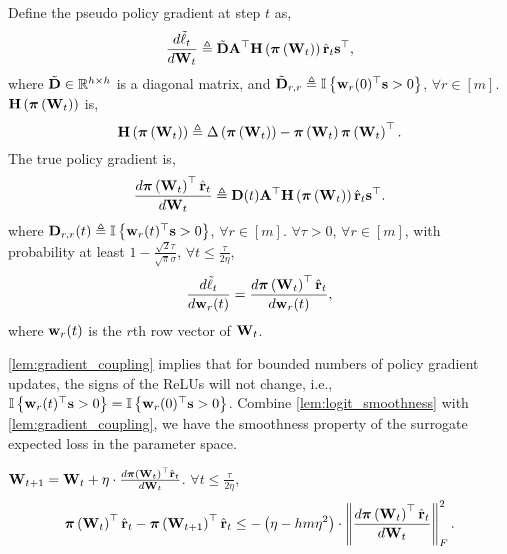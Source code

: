 \begin{lem}
\label{lem:gradient_coupling}
	Define the pseudo policy gradient at step $t$ as,
\begin{equation*}
\begin{split}
	\frac{d \tilde{\ell}_t}{d {\mathbf{W}}_t} \triangleq \tilde{{\mathbf{D}}} {\mathbf{A}}^\top {\mathbf{H}}\left( {\boldsymbol{\pi}}\left({\mathbf{W}}_t\right) \right) \hat{{\mathbf{r}}}_t {\mathbf{s}}^\top,
\end{split}
\end{equation*}
where $\tilde{{\mathbf{D}}} \in {\mathbb{R}}^{h \times h}$ is a diagonal matrix, and  $\tilde{{\mathbf{D}}}_{r,r} \triangleq {\mathbb{I}}\left\{ {\mathbf{w}}_r(0)^\top {\mathbf{s}} > 0 \right\}$, $\forall r \in [m]$. ${\mathbf{H}}\left( {\boldsymbol{\pi}}\left({\mathbf{W}}_t\right) \right)$ is,
\begin{equation*}
    {\mathbf{H}}\left( {\boldsymbol{\pi}}\left({\mathbf{W}}_t\right) \right) \triangleq \Delta\left( {\boldsymbol{\pi}}\left({\mathbf{W}}_t\right) \right) - {\boldsymbol{\pi}}\left({\mathbf{W}}_t\right) {\boldsymbol{\pi}}\left({\mathbf{W}}_t\right)^\top.
\end{equation*}
The true policy gradient is,
\begin{equation*}
\begin{split}
    \frac{d {\boldsymbol{\pi}}\left({\mathbf{W}}_t\right)^\top \hat{{\mathbf{r}}}_t}{d {\mathbf{W}}_t} \triangleq  {\mathbf{D}}(t) {\mathbf{A}}^\top {\mathbf{H}}\left( {\boldsymbol{\pi}}\left({\mathbf{W}}_t\right) \right) \hat{{\mathbf{r}}}_t {\mathbf{s}}^\top.
\end{split}
\end{equation*}
where ${\mathbf{D}}_{r,r}(t) \triangleq {\mathbb{I}}\left\{ {\mathbf{w}}_r(t)^\top {\mathbf{s}} > 0 \right\}$, $\forall r \in [m]$. $\forall \tau > 0$, $\forall r \in [m]$, with probability at least $1 - \frac{\sqrt{2}\tau}{\sqrt{\pi}\sigma}$, $\forall t \le \frac{\tau}{ 2 \eta }$,
\begin{equation*}
	\frac{d\tilde{\ell}_t}{d {\mathbf{w}}_r(t)} = \frac{d {\boldsymbol{\pi}}\left({\mathbf{W}}_t\right)^\top \hat{{\mathbf{r}}}_t}{d {\mathbf{w}}_r(t)},
\end{equation*}
where ${\mathbf{w}}_r(t)$ is the $r$th row vector of ${\mathbf{W}}_t$.
\end{lem}

\cref{lem:gradient_coupling} implies that for bounded numbers of policy gradient updates, the signs of the ReLUs will not change, i.e., ${\mathbb{I}}\left\{ {\mathbf{w}}_r(t)^\top {\mathbf{s}} > 0 \right\} = {\mathbb{I}}\left\{ {\mathbf{w}}_r(0)^\top {\mathbf{s}} > 0 \right\}$. Combine \cref{lem:logit_smoothness} with \cref{lem:gradient_coupling}, we have the smoothness property of the surrogate expected loss in the parameter space.
\begin{lem}
\label{lem:empirically_expected_reward_parameter_smoothness}
    ${\mathbf{W}}_{t+1} = {\mathbf{W}}_t + \eta \cdot \frac{d {\boldsymbol{\pi}}\left({\mathbf{W}}_t\right)^\top \hat{{\mathbf{r}}}_t}{d {\mathbf{W}}_t}$. $\forall t \le \frac{\tau}{ 2 \eta }$,
\begin{equation}
\label{eq:parameter_smoothness}
\begin{split}
    {\boldsymbol{\pi}}\left( {\mathbf{W}}_t \right)^\top \hat{{\mathbf{r}}}_t - {\boldsymbol{\pi}}\left( {\mathbf{W}}_{t+1} \right)^\top \hat{{\mathbf{r}}}_t \le - \left( \eta - h m \eta^2 \right) \cdot \left\| \frac{d {\boldsymbol{\pi}}\left( {\mathbf{W}}_t \right)^\top \hat{{\mathbf{r}}}_t}{d {\mathbf{W}}_t} \right\|_F^2.
\end{split}
\end{equation}
\end{lem}


